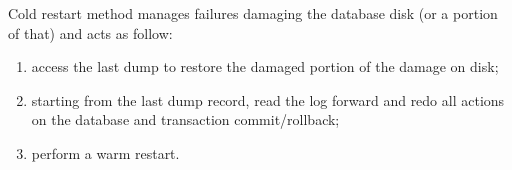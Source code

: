 Cold restart method manages failures damaging the database disk (or a portion of that) and acts as follow:
\begin{enumerate}
	\item access the last dump to restore the damaged portion of the damage on disk;
	\item starting from the last dump record, read the log forward and redo all actions on the database and transaction commit/rollback;
	\item perform a warm restart.
\end{enumerate}
